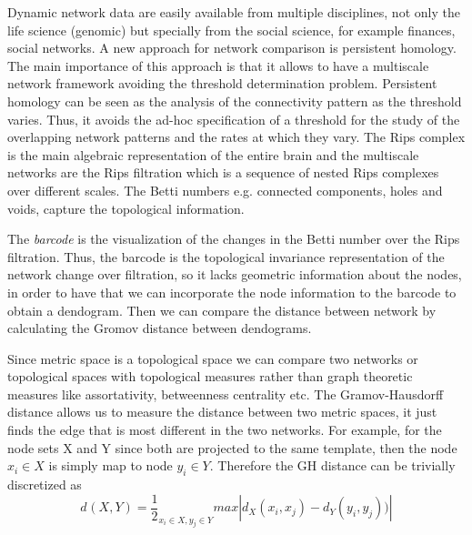 \documentclass[onecollarge,runningheads]{svjour2}
\begin{document}
Dynamic network data are easily available from multiple disciplines, not only the life science (genomic) but specially from the social science, for example finances, social networks. A new approach for network comparison is persistent homology. The main importance of this approach is that it allows to have a multiscale network framework avoiding the threshold determination problem. Persistent homology can be seen as the analysis of the connectivity pattern as the threshold varies. Thus, it avoids the ad-hoc specification of a threshold for the study of the overlapping network patterns and the rates at which they vary.
The Rips complex is the main algebraic representation of the entire brain and the multiscale networks are the Rips filtration which is a sequence of nested Rips complexes over different scales. The Betti numbers e.g. connected components, holes and voids, capture the topological information. 

The \textit{barcode} is the visualization of the changes in the Betti number over the Rips filtration. Thus, the barcode is the topological invariance representation of the network change over filtration, so it lacks geometric information about the nodes, in order to have that we can incorporate the node information to the barcode to obtain a dendogram. Then we can compare the distance between network by calculating the Gromov distance between dendograms.

Since metric space is a topological space we can compare two networks or topological spaces with topological measures rather than graph theoretic measures like assortativity, betweenness centrality etc.
The Gramov-Hausdorff distance allows us to measure the distance between two metric spaces, it just finds the edge that is most different in the two networks. For example, for the node sets X and Y since both are projected to the same template, then the node $x_i \in X$ is simply map to node $y_i \in Y$. Therefore the GH distance can be trivially discretized as 
\begin{equation}
d_{}(X,Y) = \frac{1}{2}_{x_i \in X, y_j \in Y} max |d_X(x_i,x_j) - d_Y(y_i,y_j))|
\end{equation} 
\end{document}
